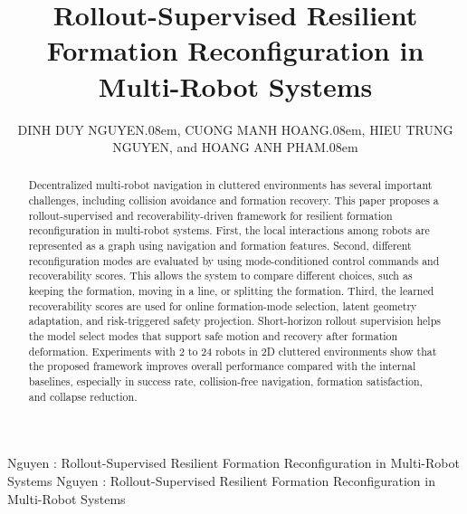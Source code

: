 \documentclass{ieeeaccess}
\newcommand{\orcidicon}[1]{\kern .08em\href{https://orcid.org/#1}{\usebox{\ORCIDlogo}}}
\begin{document}

\title{Rollout-Supervised Resilient Formation Reconfiguration in Multi-Robot Systems}

\author{\uppercase{Dinh Duy Nguyen}\orcidicon{0009-0005-7812-9546}, \uppercase{Cuong Manh Hoang}\orcidicon{0009-0007-5207-1627}, \uppercase{Hieu Trung Nguyen}, and \uppercase{Hoang Anh Pham}\orcidicon{0000-0001-9621-9266}}


\address[1]{AViS Lab., Faculty of Electronics Engineering 1, Posts and Telecommunications Institute of Technology, Hanoi, Vietnam.}
\address[2]{Faculty of Information Technology, Posts and Telecommunications Institute of Technology, Hanoi, Vietnam.}

\markboth
{Nguyen \headeretal: Rollout-Supervised Resilient Formation Reconfiguration in Multi-Robot Systems}
{Nguyen \headeretal: Rollout-Supervised Resilient Formation Reconfiguration in Multi-Robot Systems}


\titlepgskip=-15pt


\begin{abstract}
Decentralized multi-robot navigation in cluttered environments has several important challenges, including collision avoidance and formation recovery. This paper proposes a rollout-supervised and recoverability-driven framework for resilient formation reconfiguration in multi-robot systems. First, the local interactions among robots are represented as a graph using navigation and formation features. Second, different reconfiguration modes are evaluated by using mode-conditioned control commands and recoverability scores. This allows the system to compare different choices, such as keeping the formation, moving in a line, or splitting the formation. Third, the learned recoverability scores are used for online formation-mode selection, latent geometry adaptation, and risk-triggered safety projection. Short-horizon rollout supervision helps the model select modes that support safe motion and recovery after formation deformation. Experiments with 2 to 24 robots in 2D cluttered environments show that the proposed framework improves overall performance compared with the internal baselines, especially in success rate, collision-free navigation, formation satisfaction, and collapse reduction.

\end{abstract}
\end{document}
